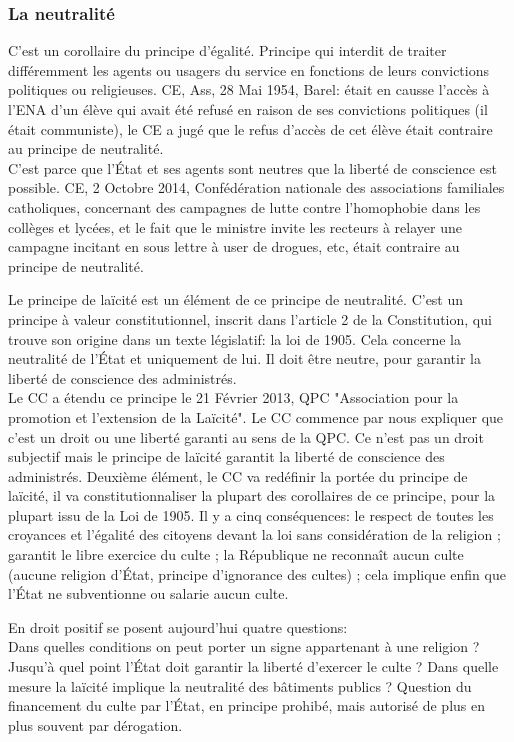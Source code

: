 \documentclass[10pt, a4paper, openany]{book}
\begin{document}
\subsubsection{La neutralité}

C'est un corollaire du principe d'égalité. Principe qui interdit de traiter différemment les agents ou usagers du service en fonctions de leurs convictions politiques ou religieuses. CE, Ass, 28 Mai 1954, Barel: était en causse l'accès à l'ENA d'un élève qui avait été refusé en raison de ses convictions politiques (il était communiste), le CE a jugé que le refus d'accès de cet élève était contraire au principe de neutralité. \\
C'est parce que l'État et ses agents sont neutres que la liberté de conscience est possible. CE, 2 Octobre 2014, Confédération nationale des associations familiales catholiques, concernant des campagnes de lutte contre l'homophobie dans les collèges et lycées, et le fait que le ministre invite les recteurs à relayer une campagne incitant en sous lettre à user de drogues, etc, était contraire au principe de neutralité.


Le principe de laïcité est un élément de ce principe de neutralité. C'est un principe à valeur constitutionnel, inscrit dans l'article 2 de la Constitution, qui trouve son origine dans un texte législatif: la loi de 1905. Cela concerne la neutralité de l'État et uniquement de lui. Il doit être neutre, pour garantir la liberté de conscience des administrés. \\
Le CC a étendu ce principe le 21 Février 2013, QPC "Association pour la promotion et l'extension de la Laïcité". Le CC commence par nous expliquer que c'est un droit ou une liberté garanti au sens de la QPC. Ce n'est pas un droit subjectif mais le principe de laïcité garantit la liberté de conscience des administrés. Deuxième élément, le CC va redéfinir la portée du principe de laïcité, il va constitutionnaliser la plupart des corollaires de ce principe, pour la plupart issu de la Loi de 1905. Il y a cinq conséquences: le respect de toutes les croyances et l'égalité des citoyens devant la loi sans considération de la religion ; garantit le libre exercice du culte ; la République ne reconnaît aucun culte (aucune religion d'État, principe d'ignorance des cultes) ; cela implique enfin que l'État ne subventionne ou salarie aucun culte.


En droit positif se posent aujourd'hui quatre questions: \\
Dans quelles conditions on peut porter un signe appartenant à une religion ? Jusqu'à quel point l'État doit garantir la liberté d'exercer le culte ? Dans quelle mesure la laïcité implique la neutralité des bâtiments publics ? Question du financement du culte par l'État, en principe prohibé, mais autorisé de plus en plus souvent par dérogation. 
\end{document}
